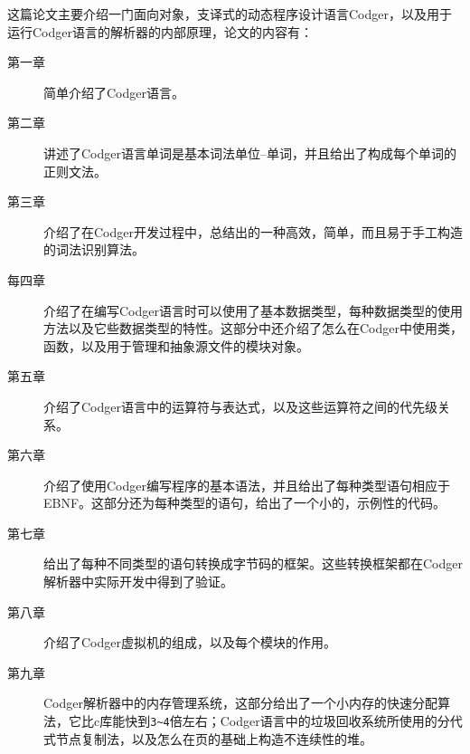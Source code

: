 \newline
这篇论文主要介绍一门面向对象，支译式的动态程序设计语言Codger，以及用于运行Codger语言的解析器的内部原理，论文的内容有：
\begin{description}
\item[第一章]简单介绍了Codger语言。
\item[第二章]讲述了Codger语言单词是基本词法单位--单词，并且给出了构成每个单词的正则文法。
\item[第三章]介绍了在Codger开发过程中，总结出的一种高效，简单，而且易于手工构造的词法识别算法。
\item[每四章]介绍了在编写Codger语言时可以使用了基本数据类型，每种数据类型的使用方法以及它些数据类型的特性。这部分中还介绍了怎么在Codger中使用类，函数，以及用于管理和抽象源文件的模块对象。
\item[第五章]介绍了Codger语言中的运算符与表达式，以及这些运算符之间的代先级关系。
\item[第六章]介绍了使用Codger编写程序的基本语法，并且给出了每种类型语句相应于EBNF。这部分还为每种类型的语句，给出了一个小的，示例性的代码。
\item[第七章]给出了每种不同类型的语句转换成字节码的框架。这些转换框架都在Codger解析器中实际开发中得到了验证。
\item[第八章]介绍了Codger虚拟机的组成，以及每个模块的作用。
\item[第九章]Codger解析器中的内存管理系统，这部分给出了一个小内存的快速分配算法，它比c库能快到\verb|3~4|倍左右；Codger语言中的垃圾回收系统所使用的分代式节点复制法，以及怎么在页的基础上构造不连续性的堆。
\end{description}

